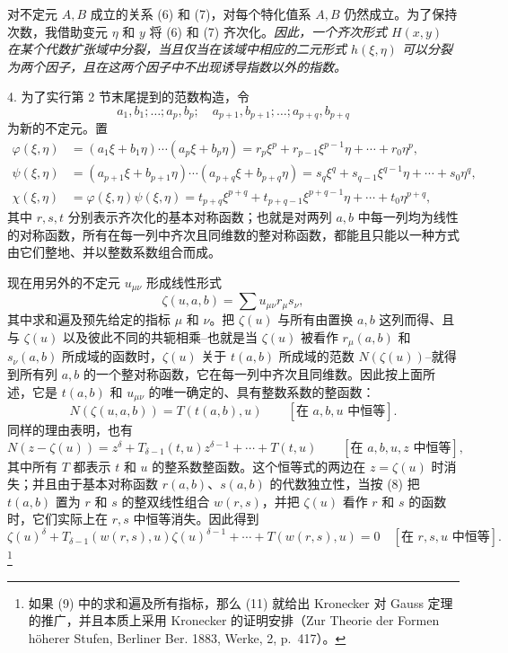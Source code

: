 对不定元 $A,B$ 成立的关系 (6) 和 (7)，对每个特化值系 $A,B$ 仍然成立。为了保持次数，我借助变元 $\eta$ 和 $y$ 将 (6) 和 (7) 齐次化。\emph{因此，一个齐次形式 $H(x,y)$ 在某个代数扩张域中分裂，当且仅当在该域中相应的二元形式 $h(\xi,\eta)$ 可以分裂为两个因子，且在这两个因子中不出现诱导指数以外的指数。}

4. 为了实行第 2 节末尾提到的范数构造，令
\[
 a_1,b_1;\ldots; a_p,b_p;\quad a_{p+1},b_{p+1};\ldots; a_{p+q},b_{p+q}
\]
为新的不定元。置
\begin{equation}
\begin{aligned}
 \varphi(\xi,\eta)&=(a_1\xi+b_1\eta)\cdots(a_p\xi+b_p\eta)
     =r_p\xi^p+r_{p-1}\xi^{p-1}\eta+\cdots+r_0\eta^p,\\
 \psi(\xi,\eta)&=(a_{p+1}\xi+b_{p+1}\eta)\cdots(a_{p+q}\xi+b_{p+q}\eta)
     =s_q\xi^q+s_{q-1}\xi^{q-1}\eta+\cdots+s_0\eta^q,\\
 \chi(\xi,\eta)&=\varphi(\xi,\eta)\psi(\xi,\eta)
     =t_{p+q}\xi^{p+q}+t_{p+q-1}\xi^{p+q-1}\eta+\cdots+t_0\eta^{p+q},
\end{aligned}
\tag{8}
\end{equation}
其中 $r,s,t$ 分别表示齐次化的基本对称函数；也就是对两列 $a,b$ 中每一列均为线性的对称函数，所有在每一列中齐次且同维数的整对称函数，都能且只能以一种方式由它们整地、并以整数系数组合而成。

现在用另外的不定元 $u_{\mu\nu}$ 形成线性形式
\begin{equation}
 \zeta(u,a,b)=\sum u_{\mu\nu}r_\mu s_\nu,
\tag{9}
\end{equation}
其中求和遍及预先给定的指标 $\mu$ 和 $\nu$。把 $\zeta(u)$ 与所有由置换 $a,b$ 这列而得、且与 $\zeta(u)$ 以及彼此不同的共轭相乘--也就是当 $\zeta(u)$ 被看作 $r_\mu(a,b)$ 和 $s_\nu(a,b)$ 所成域的函数时，$\zeta(u)$ 关于 $t(a,b)$ 所成域的范数 $N(\zeta(u))$--就得到所有列 $a,b$ 的一个整对称函数，它在每一列中齐次且同维数。因此按上面所述，它是 $t(a,b)$ 和 $u_{\mu\nu}$ 的唯一确定的、具有整数系数的整函数：
\begin{equation}
 N(\zeta(u,a,b))=T(t(a,b),u)\qquad[\text{在 }a,b,u\text{ 中恒等}].
\tag{10}
\end{equation}
同样的理由表明，也有
\[
N(z-\zeta(u))=z^\delta+T_{\delta-1}(t,u)z^{\delta-1}+\cdots+T(t,u)
\qquad[\text{在 }a,b,u,z\text{ 中恒等}],
\]
其中所有 $T$ 都表示 $t$ 和 $u$ 的整系数整函数。这个恒等式的两边在 $z=\zeta(u)$ 时消失；并且由于基本对称函数 $r(a,b)$、$s(a,b)$ 的代数独立性，当按 (8) 把 $t(a,b)$ 置为 $r$ 和 $s$ 的整双线性组合 $w(r,s)$，并把 $\zeta(u)$ 看作 $r$ 和 $s$ 的函数时，它们实际上在 $r,s$ 中恒等消失。因此得到
\begin{equation}
\zeta(u)^\delta+T_{\delta-1}(w(r,s),u)\zeta(u)^{\delta-1}+\cdots+T(w(r,s),u)=0
\quad[\text{在 }r,s,u\text{ 中恒等}].
\tag{11}
\end{equation}\footnote{如果 (9) 中的求和遍及所有指标，那么 (11) 就给出 Kronecker 对 Gauss 定理的推广，并且本质上采用 Kronecker 的证明安排（Zur Theorie der Formen h\"oherer Stufen, Berliner Ber. 1883, Werke, 2, p.~417）。}

